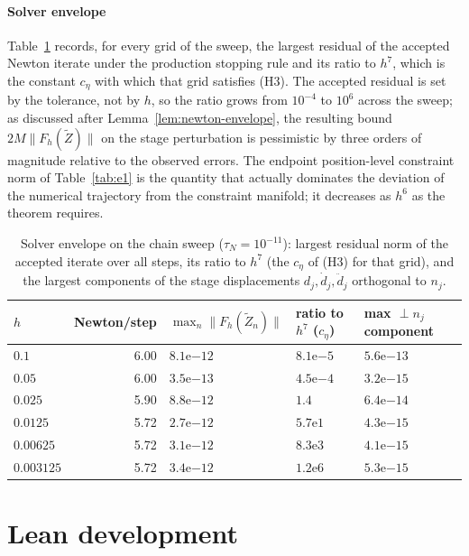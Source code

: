 \documentclass[preprint,12pt]{elsarticle}
\begin{document}
\paragraph{Solver envelope}
Table~\ref{tab:e7} records, for every grid of the sweep, the largest residual of the accepted Newton
iterate under the production stopping rule and its ratio to $h^7$, which is the constant $c_\eta$
with which that grid satisfies (H3). The accepted residual is set by the tolerance, not by $h$, so
the ratio grows from $10^{-4}$ to $10^{6}$ across the sweep; as discussed after
Lemma~\ref{lem:newton-envelope}, the resulting bound $2M\|F_h(\widetilde Z)\|$ on the stage
perturbation is pessimistic by three orders of magnitude relative to the observed errors. The
endpoint position-level constraint norm of Table~\ref{tab:e1} is the quantity that actually
dominates the deviation of the numerical trajectory from the constraint manifold; it decreases as
$h^6$ as the theorem requires.

\begin{table}[!htb]
\centering
\caption{Solver envelope on the chain sweep ($\tau_N=10^{-11}$): largest residual norm of the
accepted iterate over all steps, its ratio to $h^7$ (the $c_\eta$ of (H3) for that grid), and the
largest components of the stage displacements $d_j,\dot d_j,\ddot d_j$ orthogonal to $n_j$.}
\label{tab:e7}
\footnotesize
\begin{tabular}{@{}lrlll@{}}
\toprule
$h$ & Newton/step & $\max_n\|F_h(\widetilde Z_n)\|$ & ratio to $h^7$ ($c_\eta$) & max $\perp n_j$ component \\
\midrule
$0.1$      & 6.00 & $8.1\mathrm{e}{-12}$ & $8.1\mathrm{e}{-5}$ & $5.6\mathrm{e}{-13}$ \\
$0.05$     & 6.00 & $3.5\mathrm{e}{-13}$ & $4.5\mathrm{e}{-4}$ & $3.2\mathrm{e}{-15}$ \\
$0.025$    & 5.90 & $8.8\mathrm{e}{-12}$ & $1.4$               & $6.4\mathrm{e}{-14}$ \\
$0.0125$   & 5.72 & $2.7\mathrm{e}{-12}$ & $5.7\mathrm{e}{1}$  & $4.3\mathrm{e}{-15}$ \\
$0.00625$  & 5.72 & $3.1\mathrm{e}{-12}$ & $8.3\mathrm{e}{3}$  & $4.1\mathrm{e}{-15}$ \\
$0.003125$ & 5.72 & $3.4\mathrm{e}{-12}$ & $1.2\mathrm{e}{6}$  & $5.3\mathrm{e}{-15}$ \\
\bottomrule
\end{tabular}
\end{table}

\section{Lean development}
\label{app:lean}
\end{document}
